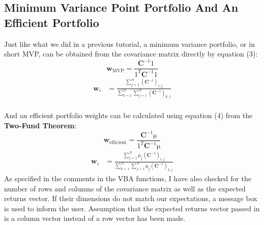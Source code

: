 \subsection{Minimum Variance Point Portfolio And An Efficient Portfolio}
Just like what we did in a previous tutorial, a minimum variance portfolio, or in short MVP, can be obtained from the covariance matrix directly by equation (3):
$$ \textbf{w}_{\text{MVP}} = \frac{\textbf{C}^{-1}\mathrm{1}}{\mathrm{1}^{T}\textbf{C}^{-1}\mathrm{1}} $$
\begin{equation}
\begin{split}
\textbf{w}_{i} &= \frac{\sum_{j=1}^{N} (\textbf{C}^{-1})_{i,j}}{\sum_{k=1}^{N}\sum_{j=1}^{N} (\textbf{C}^{-1})_{k,j}}
\end{split}
\end{equation}
\\[6mm]And an efficient portfolio weights can be calculated using equation (4) from the \textbf{Two-Fund Theorem}:
$$ \textbf{w}_{\text{efficient}} = \frac{\textbf{C}^{-1}\mathrm{\mu}}{\mathrm{1}^{T}\textbf{C}^{-1}\mathrm{\mu}} $$
\begin{equation}
\begin{split}
\textbf{w}_{i} &= \frac{\sum_{j=1}^{N} \mathrm{\mu}_{j}(\textbf{C}^{-1})_{i,j}}{\sum_{k=1}^{N}\sum_{j=1}^{N} \mathrm{\mu}_{j}(\textbf{C}^{-1})_{k,j}}
\end{split}
\end{equation}
As specified in the comments in the VBA functions, I have also checked for the number of rows and columns of the covariance matrix as well as the expected returns vector. If their dimensions do not match our expectations, a message box is used to inform the user. Assumption that the expected returns vector passed in is a column vector instead of a row vector has been made.
\newpage

